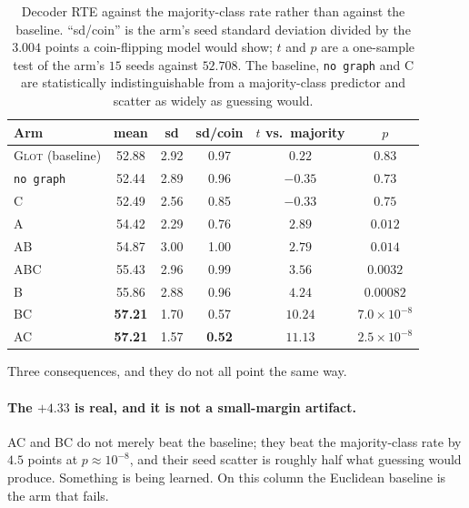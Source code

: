 \documentclass{article}
\begin{document}
\begin{table}[h]
\caption{Decoder RTE against the majority-class rate rather than against the
baseline. ``sd/coin'' is the arm's seed standard deviation divided by the
$3.004$ points a coin-flipping model would show; $t$ and $p$ are a one-sample
test of the arm's $15$ seeds against $52.708$. The baseline, \texttt{no graph}
and C are statistically indistinguishable from a majority-class predictor and
scatter as widely as guessing would.}
\label{tab:chance}
\begin{center}
\small
\begin{tabular}{lccccc}
\toprule
Arm & mean & sd & sd/coin & $t$ vs.\ majority & $p$ \\
\midrule
\textsc{Glot} (baseline) & 52.88 & 2.92 & 0.97 & $0.22$ & $0.83$ \\
\texttt{no graph}        & 52.44 & 2.89 & 0.96 & $-0.35$ & $0.73$ \\
C                        & 52.49 & 2.56 & 0.85 & $-0.33$ & $0.75$ \\
\midrule
A                        & 54.42 & 2.29 & 0.76 & $2.89$ & $0.012$ \\
AB                       & 54.87 & 3.00 & 1.00 & $2.79$ & $0.014$ \\
ABC                      & 55.43 & 2.96 & 0.99 & $3.56$ & $0.0032$ \\
B                        & 55.86 & 2.88 & 0.96 & $4.24$ & $0.00082$ \\
BC                       & \textbf{57.21} & 1.70 & 0.57 & $10.24$ & $7.0{\times}10^{-8}$ \\
AC                       & \textbf{57.21} & 1.57 & \textbf{0.52} & $11.13$ & $2.5{\times}10^{-8}$ \\
\bottomrule
\end{tabular}
\end{center}
\end{table}

Three consequences, and they do not all point the same way.

\paragraph{The $+4.33$ is real, and it is not a small-margin artifact.} AC and
BC do not merely beat the baseline; they beat the majority-class rate by
$4.5$ points at $p \approx 10^{-8}$, and their seed scatter is roughly half
what guessing would produce. Something is being learned. On this column the
Euclidean baseline is the arm that fails.
\end{document}
